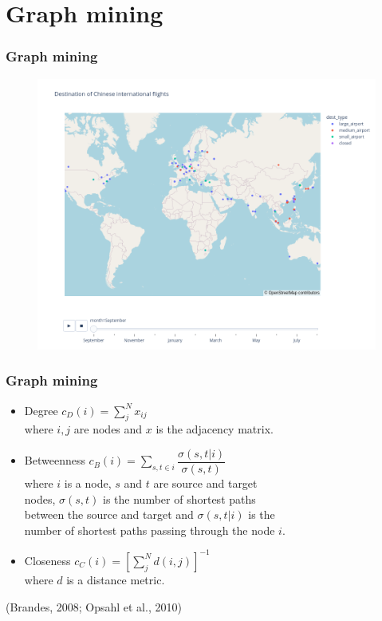 \documentclass{beamer}
\begin{document}
\section{Graph mining}
\begin{frame}
\frametitle{Graph mining}

\begin{figure}
\centering
\includegraphics[width=0.8\linewidth]{../visualizations/chinese_flights.png}
\end{figure}

\end{frame}


\begin{frame}
\frametitle{Graph mining}

\begin{itemize}
  \item Degree \hspace{36px} $c_D (i) = \sum_j^N x_{ij}$ \\
    \hspace{72px} where $i, j$ are nodes and $x$ is the adjacency matrix.
  \vfill
  \item Betweenness \hspace{10px} $c_B (i) = \sum_{s, t \in i} \dfrac{\sigma (s, t | i)}{\sigma (s, t)}$ \\
    \hspace{72px} where $i$ is a node, $s$ and $t$ are source and target \\
    \hspace{72px} nodes, $\sigma (s, t)$ is the number of shortest paths \\
    \hspace{72px} between the source and target and $\sigma (s, t | i)$ is the \\
    \hspace{72px} number of shortest paths passing through the node $i$.
  \vfill
  \item Closeness \hspace{25px} $c_C(i) = \left[ \sum_j^N d(i, j) \right]^{-1}$ \\
    \hspace{72px} where $d$ is a distance metric.
\end{itemize}

\vfill

(Brandes, 2008; Opsahl et al., 2010)

\end{frame}
\end{document}
